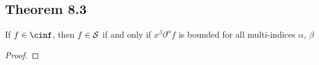 \documentclass[../../main.tex]{subfiles}
\begin{document}
\subsection{Theorem 8.3}
\begin{wts}
    If $f\in\cinf$, then $f\in\mathcal{S}$ if and only if $x^\beta\partial^\alpha f$ is bounded for all multi-indices $\alpha$, $\beta$
\end{wts}
\begin{proof}

\end{proof}
\end{document}
